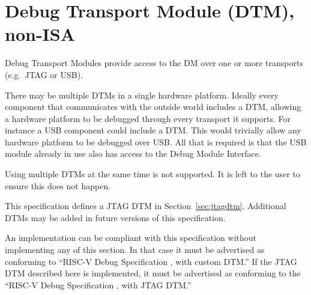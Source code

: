 \chapter{Debug Transport Module (DTM), non-ISA} \label{dtm}

Debug Transport Modules provide access to the DM over one or more transports
(e.g.\ JTAG or USB).

There may be multiple DTMs in a single hardware platform. Ideally every component that
communicates with the outside world includes a DTM, allowing a hardware platform to be
debugged through every transport it supports.  For instance a USB component
could include a DTM. This would trivially allow any hardware platform to be debugged
over USB. All that is required is that the USB module already in use also has
access to the Debug Module Interface.

Using multiple DTMs at the same time is not supported. It is left to the user
to ensure this does not happen.

This specification defines a JTAG DTM in Section~\ref{sec:jtagdtm}. Additional DTMs
may be added in future versions of this specification.

An implementation can be compliant with this specification without implementing
any of this section. In that case it must be advertised as conforming to
``RISC-V Debug Specification \versionnum, with custom DTM.'' If the JTAG DTM
described here is implemented, it must be advertised as conforming to the
``RISC-V Debug Specification \versionnum, with JTAG DTM.''


